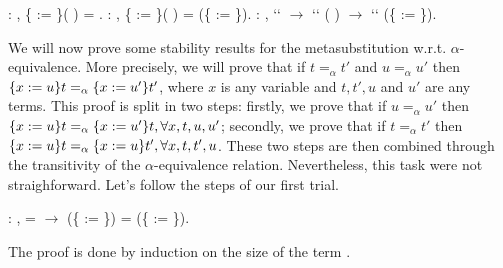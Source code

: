 \begin{coqdoccode}
\coqdocemptyline
\coqdocnoindent
{} : \coqdockw{\ensuremath{\forall}}   , \{ := \}(  ) =   .\coqdoceol
\coqdocemptyline
\coqdocnoindent
{} : \coqdockw{\ensuremath{\forall}}    , \{ := \}(   ) =    (\{ := \}).\coqdoceol
\coqdocemptyline
\coqdocnoindent
{} : \coqdockw{\ensuremath{\forall}}    ,  ``   \ensuremath{\rightarrow}  ``   ( ) \ensuremath{\rightarrow}  ``  (\{ := \}).\coqdoceol
 \coqdocemptyline
\end{coqdoccode}
We will now prove some stability results for the metasubstitution w.r.t. $\alpha$-equivalence. More precisely, we will prove that if $t =_\alpha t'$ and $u =_\alpha u'$ then $\metasub{t}{x}{u} =_\alpha \metasub{t'}{x}{u'}$, where $x$ is any variable and $t, t', u$ and $u'$ are any  terms. This proof is split in two steps: firstly, we prove that if $u =_\alpha u'$ then $\metasub{t}{x}{u} =_\alpha \metasub{t}{x}{u'}, \forall x, t, u, u'$; secondly, we prove that if $t =_\alpha t'$ then $\metasub{t}{x}{u} =_\alpha \metasub{t'}{x}{u}, \forall x, t, t', u$. These two steps are then combined through the transitivity of the $\alpha$-equivalence relation. Nevertheless, this task were not straighforward. Let's follow the steps of our first trial.
\begin{coqdoccode}
\coqdocemptyline
\coqdocnoindent
{} : \coqdockw{\ensuremath{\forall}}    ,  =  \ensuremath{\rightarrow} (\{ := \}) = (\{ := \}).\coqdoceol
\end{coqdoccode}
 The proof is done by induction on the size of the term .
